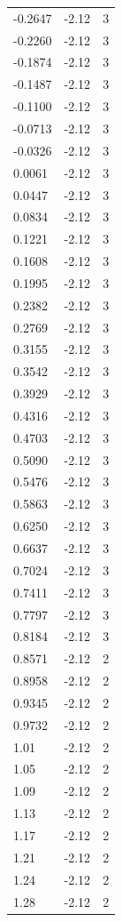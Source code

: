 \begin{longtable}{lrr}
  -0.2647 & -2.12 & 3 \\
  -0.2260 & -2.12 & 3 \\
  -0.1874 & -2.12 & 3 \\
  -0.1487 & -2.12 & 3 \\
  -0.1100 & -2.12 & 3 \\
  -0.0713 & -2.12 & 3 \\
  -0.0326 & -2.12 & 3 \\
  0.0061 & -2.12 & 3 \\
  0.0447 & -2.12 & 3 \\
  0.0834 & -2.12 & 3 \\
  0.1221 & -2.12 & 3 \\
  0.1608 & -2.12 & 3 \\
  0.1995 & -2.12 & 3 \\
  0.2382 & -2.12 & 3 \\
  0.2769 & -2.12 & 3 \\
  0.3155 & -2.12 & 3 \\
  0.3542 & -2.12 & 3 \\
  0.3929 & -2.12 & 3 \\
  0.4316 & -2.12 & 3 \\
  0.4703 & -2.12 & 3 \\
  0.5090 & -2.12 & 3 \\
  0.5476 & -2.12 & 3 \\
  0.5863 & -2.12 & 3 \\
  0.6250 & -2.12 & 3 \\
  0.6637 & -2.12 & 3 \\
  0.7024 & -2.12 & 3 \\
  0.7411 & -2.12 & 3 \\
  0.7797 & -2.12 & 3 \\
  0.8184 & -2.12 & 3 \\
  0.8571 & -2.12 & 2 \\
  0.8958 & -2.12 & 2 \\
  0.9345 & -2.12 & 2 \\
  0.9732 & -2.12 & 2 \\
  1.01 & -2.12 & 2 \\
  1.05 & -2.12 & 2 \\
  1.09 & -2.12 & 2 \\
  1.13 & -2.12 & 2 \\
  1.17 & -2.12 & 2 \\
  1.21 & -2.12 & 2 \\
  1.24 & -2.12 & 2 \\
  1.28 & -2.12 & 2 \\

\end{longtable}
